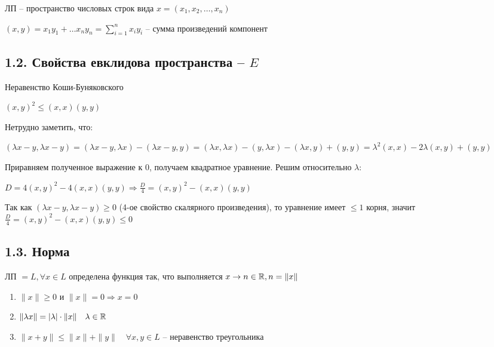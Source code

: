 \documentclass[12pt]{article}
\begin{document}
     ЛП -- пространство числовых строк вида $x = (x_1, x_2, \dots, x_n)$

    $(x, y) = x_1 y_1 + \dots x_n y_n = \sum_{i=1}^n x_i y_i$ -- сумма произведений компонент

    \subsection{1.2. Свойства евклидова пространства -- $E$}

    \hypertarget{inequalityofCauchyBunyakovsky}{}

    \begin{MyTheorem}
        \Ths Неравенство Коши-Буняковского

        $(x, y)^2 \leq (x, x)(y, y)$
    \end{MyTheorem}

    \begin{MyProof}
        Нетрудно заметить, что:

        $(\lambda x - y, \lambda x - y) = (\lambda x - y, \lambda x) - (\lambda x - y, y) =
        (\lambda x, \lambda x) - (y, \lambda x) - (\lambda x, y) + (y, y) = \lambda^2 (x, x) - 2\lambda (x, y) + (y, y)$

        Приравняем полученное выражение к 0, получаем квадратное уравнение. Решим относительно $\lambda$:

        $D = 4(x, y)^2 - 4(x, x)(y, y) \Longrightarrow \frac{D}{4} = (x, y)^2 - (x, x)(y, y)$

        Так как $(\lambda x - y, \lambda x - y) \geq 0$ (4-ое свойство скалярного произведения), то уравнение имеет $\leq 1$ корня, значит
        $\frac{D}{4} = (x, y)^2 - (x, x)(y, y) \leq 0$
    \end{MyProof}

    \subsection{1.3. Норма}

    \hypertarget{normdefinition}{}

    ЛП $= L, \forall x \in L$ определена функция так, что выполняется $x \to n \in \mathbb{R}, n = \|x\|$

    \begin{enumerate}
        \item $\|x\| \geq 0$ и $\|x\| = 0 \Longrightarrow x = 0$
        \item $\|\lambda x\| = |\lambda| \cdot \|x\| \quad \lambda \in \mathbb{R}$
        \item $\|x + y\| \leq \|x\| + \|y\| \quad \forall x, y \in L$ -- неравенство треугольника
    \end{enumerate}
\end{document}
